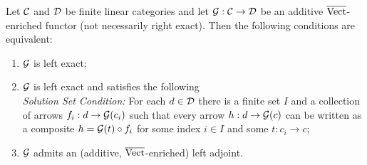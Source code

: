 \documentclass{amsart}
\begin{document}
\begin{proposition}
	Let $\mathcal C$ and $\mathcal D$ be finite linear categories and let $\mathcal G: \mathcal C \rightarrow \mathcal D$  be an additive $\overline{\mathrm{Vect}}$-enriched functor (not necessarily right exact). Then the following conditions are equivalent:
	\begin{enumerate}
		\item $\mathcal G$ is left exact;  
		\item $\mathcal G$ is left exact and satisfies the following \\ {\em Solution Set Condition:} For each $d \in \mathcal D$ there is a finite set $I$ and a collection of arrows $f_i:d \to \mathcal G(c_i)$ such that every arrow $h:d \to \mathcal G(c)$ can be written as a composite $h = \mathcal G(t) \circ f_i$ for some index $i \in I$ and some $t: c_i \to c$; 
		\item $\mathcal G$ admits an (additive, $\overline{\mathrm{Vect}}$-enriched) left adjoint.
	\end{enumerate}
\end{proposition}
\end{document}
